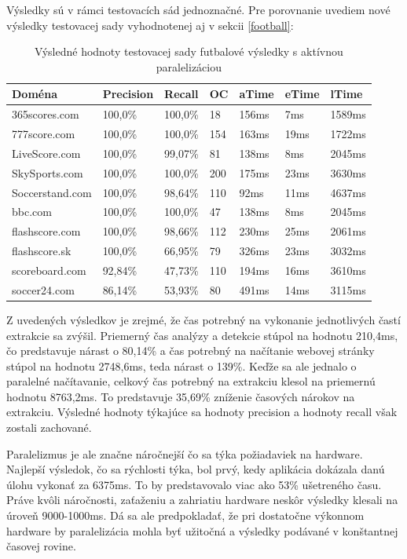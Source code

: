 Výsledky sú v rámci testovacích sád jednoznačné. Pre porovnanie uvediem nové výsledky testovacej sady  vyhodnotenej aj v sekcii \ref{football}:

\begin{table}[hbt]
\caption{Výsledné hodnoty testovacej sady futbalové výsledky s aktívnou paralelizáciou}
\centering
\begin{tabular}{|l|l|l|l|l|l|l|}
\hline
\textbf{Doména}          & \textbf{Precision} & \textbf{Recall}  & \textbf{OC}  & \textbf{aTime} & \textbf{eTime} & \textbf{lTime}  \\ \hline
365scores.com   & 100,0\%   & 100,0\% & 18  & 156ms & 7ms   & 1589ms  \\ \hline
777score.com    & 100,0\%   & 100,0\% & 154 & 163ms  & 19ms  & 1722ms \\ \hline
LiveScore.com   & 100,0\%   & 99,07\% & 81  & 138ms  & 8ms   & 2045ms  \\ \hline
SkySports.com   & 100,0\%   & 100,0\% & 200 & 175ms & 23ms  & 3630ms  \\ \hline
Soccerstand.com & 100,0\%   & 98,64\% & 110 & 92ms  & 11ms  & 4637ms \\ \hline
bbc.com         & 100,0\%   & 100,0\% & 47  &  138ms  & 8ms  & 2045ms \\ \hline
flashscore.com  & 100,0\%   & 98,66\% & 112 & 230ms  & 25ms   & 2061ms \\ \hline
flashscore.sk   & 100,0\%   & 66,95\% & 79  & 326ms & 23ms   & 3032ms \\ \hline
scoreboard.com  & 92,84\%   & 47,73\% & 110 & 194ms & 16ms  & 3610ms \\ \hline
soccer24.com    & 86,14\%   & 53,93\% & 80  & 491ms & 14ms  & 3115ms \\ \hline
\end{tabular}
\end{table}

Z uvedených výsledkov je zrejmé, že čas potrebný na vykonanie jednotlivých častí extrakcie sa zvýšil. Priemerný čas analýzy a detekcie stúpol na hodnotu 210,4ms, čo predstavuje nárast o 80,14\% a čas potrebný na načítanie webovej stránky stúpol na hodnotu 2748,6ms, teda nárast o 139\%. Keďže sa ale jednalo o paralelné načítavanie, celkový čas potrebný na extrakciu klesol na priemernú hodnotu 8763,2ms. To predstavuje 35,69\% zníženie časových nárokov na extrakciu. Výsledné hodnoty týkajúce sa hodnoty precision a hodnoty recall však zostali zachované.

Paralelizmus je ale značne náročnejší čo sa týka požiadaviek na hardware. Najlepší výsledok, čo sa rýchlosti týka, bol prvý, kedy aplikácia dokázala danú úlohu vykonať za 6375ms. To by predstavovalo viac ako 53\% ušetreného času. Práve kvôli náročnosti, zaťaženiu a zahriatiu hardware neskôr výsledky klesali na úroveň 9000-1000ms. Dá sa ale predpokladať, že pri dostatočne výkonnom hardware by paralelizácia mohla byť užitočná a výsledky podávané v konštantnej časovej rovine.

